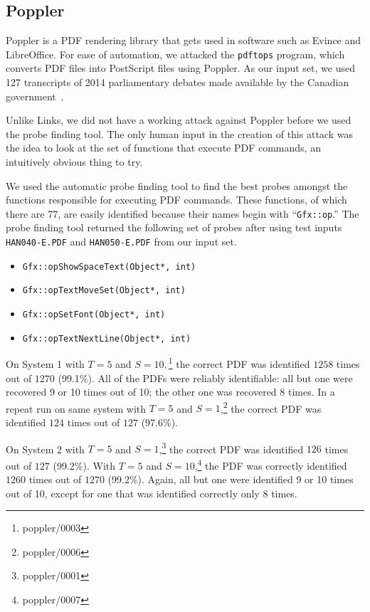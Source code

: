 \documentclass[letterpaper,twocolumn,10pt]{article}
\begin{document}
\subsection{Poppler}

Poppler is a PDF rendering library that gets used in software such as Evince and
LibreOffice. For ease of automation, we attacked the \texttt{pdftops} program,
which converts PDF files into PostScript files using Poppler. As our input set,
we used 127 transcripts of 2014 parliamentary debates made available by the
Canadian government~\cite{hansard}.

Unlike Links, we did not have a working attack against Poppler before we used
the probe finding tool. The only human input in the creation of this attack was
the idea to look at the set of functions that execute PDF commands, an
intuitively obvious thing to try.

We used the automatic probe finding tool to find the best probes amongst the
functions responsible for executing PDF commands. These functions, of which
there are 77, are easily identified because their names begin with ``\texttt{Gfx::op}.''
The probe finding tool returned the following set of probes after using test
inputs \texttt{HAN040-E.PDF} and \texttt{HAN050-E.PDF} from our input set.

\begin{itemize}
\setlength{\itemsep}{0pt}
    \item \texttt{Gfx::opShowSpaceText(Object*, int)}
    \item \texttt{Gfx::opTextMoveSet(Object*, int)}
    \item \texttt{Gfx::opSetFont(Object*, int)}
    \item \texttt{Gfx::opTextNextLine(Object*, int)}
\end{itemize}

On System 1 with $T=5$ and $S=10,$\footnote{poppler/0003} the correct PDF was
identified $1258$ times out of $1270$ (99.1\%). All of the PDFs were reliably
identifiable: all but one were recovered 9 or 10 times out of 10; the other one
was recovered 8 times. In a repeat run on same system with $T=5$ and
$S=1$,\footnote{poppler/0006} the correct PDF was identified $124$ times out of
$127$ (97.6\%).

On System 2 with $T=5$ and $S=1$,\footnote{poppler/0001} the correct PDF was
identified $126$ times out of $127$ (99.2\%). With $T=5$ and
$S=10$,\footnote{poppler/0007} the PDF was correctly identified $1260$ times out
of $1270$ (99.2\%). Again, all but one were identified 9 or 10 times out of 10,
except for one that was identified correctly only 8 times.
\end{document}
